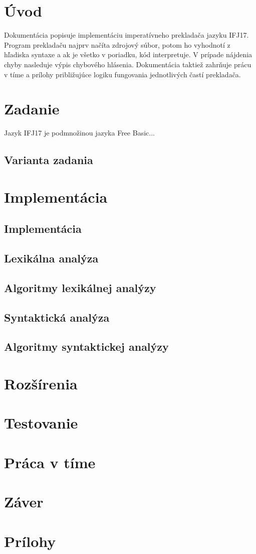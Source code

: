 \documentclass{article}
\begin{document}
\vspace{8cm}

\section{Úvod}
Dokumentácia popisuje implementáciu imperatívneho prekladača jazyku IFJ17. Program prekladaču
 najprv načíta zdrojový súbor, potom ho vyhodnotí z hľadiska syntaxe a ak je všetko v poriadku, 
 kód interpretuje. V prípade nájdenia chyby nasleduje výpis chybového hlásenia. 
Dokumentácia taktiež zahrňuje prácu v tíme a prílohy približujúce logiku fungovania jednotlivých 
častí prekladača. 

\section{Zadanie}
Jazyk IFJ17 je podmnožinou jazyka Free Basic...

\subsection{Varianta zadania}

\section{Implementácia}

\subsection{Implementácia}
\subsection{Lexikálna analýza}
\subsection{Algoritmy lexikálnej analýzy}
\subsection{Syntaktická analýza}
\subsection{Algoritmy syntaktickej analýzy}

\section{Rozšírenia}

\section{Testovanie}

\section{Práca v tíme}

\section{Záver}

\section{Prílohy}
\end{document}
